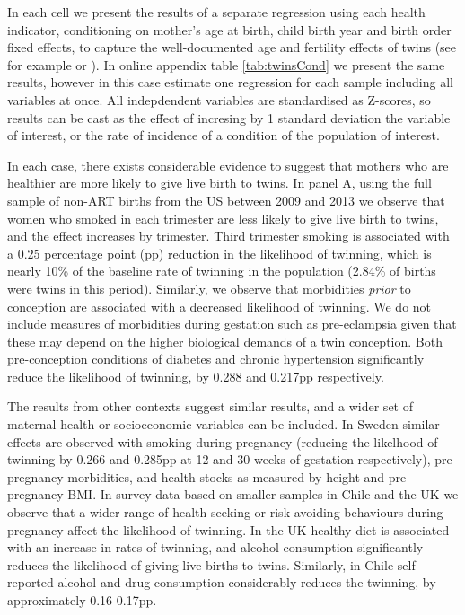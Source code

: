 \documentclass[subeqn]{article}
\begin{document}
\begin{spacing}{1.4}
In each cell we present the results of a separate regression using each health
indicator, conditioning on mother's age at birth, child birth year and birth
order fixed effects, to capture the well-documented age and fertility effects
of twins (see for example \citet{Hall2003} or \citet{RosenzweigWolpin1980}). In
online appendix table \ref{tab:twinsCond} we present the same results, however
in this case estimate one regression for each sample including all variables at
once. All indepdendent variables are standardised as Z-scores, so results can
be cast as the effect of incresing by 1 standard deviation the variable of
interest, or the rate of incidence of a condition of the population of interest.

In each case, there exists considerable evidence to suggest that mothers who
are healthier are more likely to give live birth to twins.  In panel A, using
the full sample of non-ART births from the US between 2009 and 2013 we observe
that women who smoked in each trimester are less likely to give live birth to
twins, and the effect increases by trimester.  Third trimester smoking is
associated with a 0.25 percentage point (pp) reduction in the likelihood of
twinning, which is nearly 10\% of the baseline rate of twinning in the
population (2.84\% of births were twins in this period).  Similarly, we observe
that morbidities \emph{prior} to conception are associated with a decreased
likelihood of twinning.  We do not include measures of morbidities during
gestation such as pre-eclampsia given that these may depend on the higher
biological demands of a twin conception.  Both pre-conception conditions of
diabetes and chronic hypertension significantly reduce the likelihood of
twinning, by 0.288 and 0.217pp respectively. 

The results from other contexts suggest similar results, and a wider set of
maternal health or socioeconomic variables can be included.  In Sweden similar
effects are observed with smoking during pregnancy (reducing the likelhood of
twinning by 0.266 and 0.285pp at 12 and 30 weeks of gestation respectively),
pre-pregnancy morbidities, and health stocks as measured by height and pre-%
pregnancy BMI.  In survey data based on smaller samples in Chile and the UK
we observe that a wider range of health seeking or risk avoiding behaviours
during pregnancy affect the likelihood of twinning.  In the UK healthy diet
is associated with an increase in rates of twinning, and alcohol consumption
significantly reduces the likelihood of giving live births to twins. Similarly,
in Chile self-reported alcohol and drug consumption considerably reduces the
twinning, by approximately 0.16-0.17pp.


\end{spacing}
\end{document}
